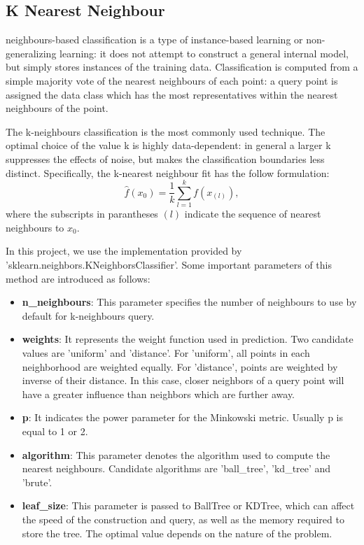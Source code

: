 \documentclass[10pt,journal,compsoc]{IEEEtran}
\begin{document}
\subsection{K Nearest Neighbour}
\label{subsec:k_nearest_neighbour}
neighbours-based classification is a type of instance-based learning or non-generalizing learning: it does not attempt to construct a general internal model, but simply stores instances of the training data. Classification is computed from a simple majority vote of the nearest neighbours of each point: a query point is assigned the data class which has the most representatives within the nearest neighbours of the point.

The k-neighbours classification is the most commonly used technique. The optimal choice of the value k is highly data-dependent: in general a larger k  suppresses the effects of noise, but makes the classification boundaries less distinct. Specifically, the k-nearest neighbour fit has the follow formulation:
\begin{equation}
  \hat{f}(x_0) = \frac{1}{k}\sum_{l=1}^k f(x_{(l)}),
\end{equation}
where the subscripts in parantheses $(l)$ indicate the sequence of nearest neighbours to $x_0$.

In this project, we use the implementation provided by 'sklearn.neighbors.KNeighborsClassifier'. Some important parameters of this method are introduced as follows:
\begin{itemize}
  \item \textbf{n\_neighbours}: This parameter specifies the number of neighbours to use by default for k-neighbours query.
  \item \textbf{weights}: It represents the weight function used in prediction. Two candidate values are 'uniform' and 'distance'. For 'uniform', all points in each neighborhood are weighted equally. For 'distance', points are weighted by inverse of their distance. In this case, closer neighbors of a query point will have a greater influence than neighbors which are further away.
  \item \textbf{p}: It indicates the power parameter for the Minkowski metric. Usually p is equal to 1 or 2.
  \item \textbf{algorithm}: This parameter denotes the algorithm used to compute the nearest neighbours. Candidate algorithms are 'ball\_tree', 'kd\_tree' and 'brute'.
  \item \textbf{leaf\_size}: This parameter is passed to BallTree or KDTree, which can affect the speed of the construction and query, as well as the memory required to store the tree. The optimal value depends on the nature of the problem.
\end{itemize}
\end{document}
